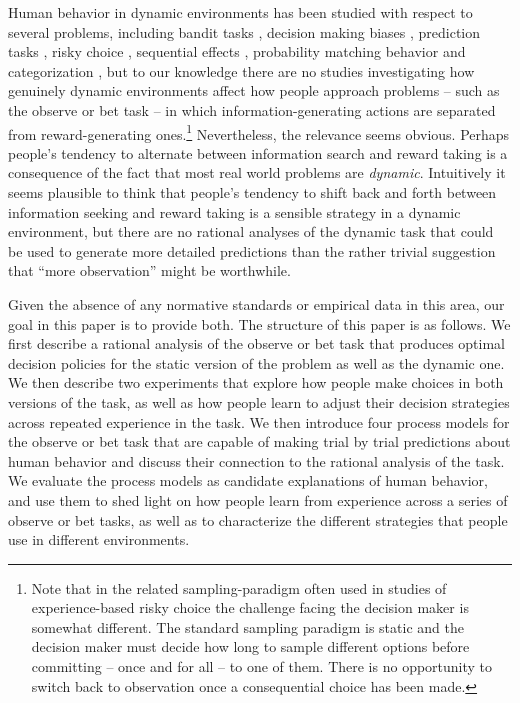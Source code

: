 \documentclass[authoryear]{elsarticle}
\begin{document}
Human behavior in dynamic environments has been studied with respect to several problems, including bandit tasks \citep{daw_cortical_2006,speekenbrink_uncertainty_2014,speekenbrink_uncertainty_2015}, decision making biases \citep{ayton_hot_2004}, prediction tasks \citep{brown_detecting_2009,osman_prediction_2012}, risky choice \citep{rakow_doomed_2009}, sequential effects \citep{yu_sequential_2008}, probability matching behavior \citep{green_alterations_2010} and categorization \citep{navarro_learning_2013}, but to our knowledge there are no studies investigating how genuinely dynamic environments affect how people approach problems -- such as the observe or bet task -- in which information-generating actions are separated from reward-generating ones.\footnote{Note that in the related sampling-paradigm often used in studies of experience-based risky choice \citep[e.g.,][]{hertwig_decisions_2004,rakow_biased_2008,camilleri_when_2011} the challenge facing the decision maker is somewhat different. The standard sampling paradigm is static  and the decision maker must decide how long to sample different options before committing -- once and for all -- to one of them. There is no opportunity to switch back to observation once a consequential choice has been made.} Nevertheless, the relevance seems obvious. Perhaps people's tendency to alternate between information search and reward taking is a consequence of the fact that most real world problems are {\it dynamic}. Intuitively it seems plausible to think that people's tendency to shift back and forth between information seeking and reward taking is a sensible strategy in a dynamic environment, but there are no rational analyses of the dynamic task that could be used to generate more detailed predictions than the rather trivial suggestion that ``more observation'' might be worthwhile.

Given the absence of any normative standards or empirical data in this area, our goal in this paper is to provide both. The structure of this paper is as follows. We first describe a rational analysis of the observe or bet task that produces optimal decision policies for the static version of the problem as well as the dynamic one. We then describe two experiments that explore how people make choices in both versions of the task, as well as how people learn to adjust their decision strategies across repeated experience in the task. We then introduce four process models for the observe or bet task that are capable of making trial by trial predictions about human behavior and discuss their connection to the rational analysis of the task. We evaluate the process models as candidate explanations of human behavior, and use them to shed light on how people learn from experience across a series of observe or bet tasks, as well as to characterize the different strategies that people use in different environments.
\end{document}
